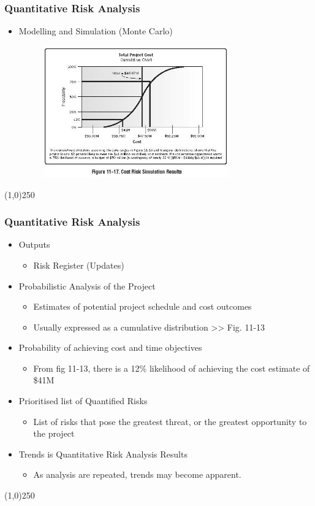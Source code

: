 \begin{frame}
\frametitle{Quantitative Risk Analysis}
\begin{itemize}
\item Modelling and Simulation (Monte Carlo)
\begin{figure}
	\centering
		\includegraphics[width = 8cm]{images/Fig11-17.jpg}
	\label{fig:11-17}
\end{figure}
\end{itemize}
\end{frame}\begin{center}\line(1,0){250}\end{center}



\begin{frame}
\frametitle{Quantitative Risk Analysis}
\begin{itemize}
\item Outputs
\begin{itemize}
	\item Risk Register (Updates)
\end{itemize}
\item Probabilistic Analysis of the Project
\begin{itemize}
	\item Estimates of potential project schedule and cost outcomes
\item Usually expressed as a cumulative distribution >> Fig. 11-13
\end{itemize}
\item Probability of achieving cost and time objectives
\begin{itemize}
	\item From fig 11-13, there is a 12\% likelihood of achieving the cost estimate of \$41M
\end{itemize}
\item Prioritised list of Quantified Risks
\begin{itemize}
	\item List of risks that pose the greatest threat, or the greatest opportunity to the project
\end{itemize}
\item Trends is Quantitative Risk Analysis Results
\begin{itemize}
	\item As analysis are repeated, trends may become apparent.
\end{itemize}
\end{itemize}
\end{frame}\begin{center}\line(1,0){250}\end{center}




